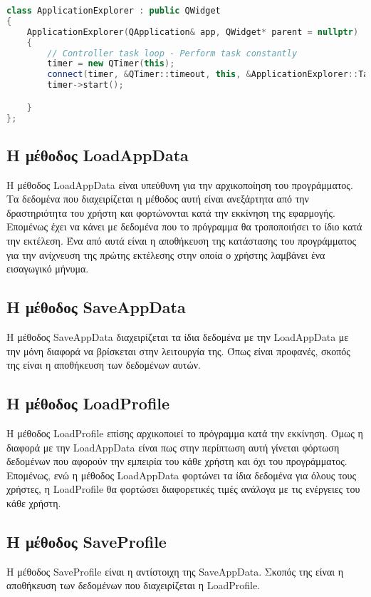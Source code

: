 \begin{lstlisting}[language=C++, style=cppstyle]
class ApplicationExplorer : public QWidget
{
    ApplicationExplorer(QApplication& app, QWidget* parent = nullptr) : QWidget(parent), app(app)
    {
        // Controller task loop - Perform task constantly
        timer = new QTimer(this);
        connect(timer, &QTimer::timeout, this, &ApplicationExplorer::TaskGamepadConnection);
        timer->start();

    }
};
\end{lstlisting}



\subsection{Η μέθοδος LoadAppData}
Η μέθοδος LoadAppData είναι υπεύθυνη για την αρχικοποίηση του προγράμματος. Τα
δεδομένα που διαχειρίζεται η μέθοδος αυτή είναι ανεξάρτητα από την δραστηριότητα
του χρήστη και φορτώνονται κατά την εκκίνηση της εφαρμογής. Επομένως έχει να 
κάνει με δεδομένα που το πρόγραμμα θα τροποποιήσει το ίδιο κατά την εκτέλεση. 
Ένα από αυτά είναι η αποθήκευση της κατάστασης του προγράμματος για την ανίχνευση 
της πρώτης εκτέλεσης στην οποία ο χρήστης λαμβάνει ένα εισαγωγικό μήνυμα.



\subsection{Η μέθοδος SaveAppData}
Η μέθοδος SaveAppData διαχειρίζεται τα ίδια δεδομένα με την LoadAppData με την μόνη
διαφορά να βρίσκεται στην λειτουργία της. Όπως είναι προφανές, σκοπός της είναι η
αποθήκευση των δεδομένων αυτών.

\subsection{Η μέθοδος LoadProfile}
Η μέθοδος LoadProfile επίσης αρχικοποιεί το πρόγραμμα κατά την εκκίνηση. Όμως η διαφορά
με την LoadAppData είναι πως στην περίπτωση αυτή γίνεται φόρτωση δεδομένων που αφορούν
την εμπειρία του κάθε χρήστη και όχι του προγράμματος. Επομένως, ενώ η μέθοδος LoadAppData
φορτώνει τα ίδια δεδομένα για όλους τους χρήστες, η LoadProfile θα φορτώσει διαφορετικές
τιμές ανάλογα με τις ενέργειες του κάθε χρήστη.

\subsection{Η μέθοδος SaveProfile}
Η μέθοδος SaveProfile είναι η αντίστοιχη της SaveAppData. Σκοπός της είναι η αποθήκευση
των δεδομένων που διαχειρίζεται η LoadProfile.


